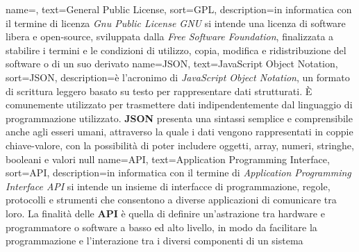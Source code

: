  {
    name=,
    text=General Public License,
    sort=GPL,
    description={in informatica con il termine di licenza \textit{Gnu Public License GNU} si intende  
    una licenza di software libera e open-source, sviluppata dalla \textit{Free Software Foundation}, finalizzata a stabilire i termini e le condizioni 
    di utilizzo, copia, modifica e ridistribuzione del software o di un suo derivato}
}
{
    name={JSON},
    text=JavaScript Object Notation,
    sort=JSON,
    description={è l'acronimo di \textit{JavaScript Object Notation}, un formato di scrittura leggero basato su testo per rappresentare dati strutturati. 
    È comunemente utilizzato per trasmettere dati indipendentemente dal linguaggio di programmazione utilizzato. \textbf{JSON} presenta una sintassi semplice e comprensibile anche agli 
    esseri umani, attraverso la quale i dati vengono rappresentati in coppie chiave-valore, con la possibilità di poter includere 
    oggetti, array, numeri, stringhe, booleani e valori null}
}
{
    name={API},
    text=Application Programming Interface,
    sort=API,
    description={in informatica con il termine di \textit{Application Programming Interface API} si intende un insieme di interfacce di 
    programmazione, regole, protocolli e strumenti che consentono a diverse applicazioni di comunicare tra loro. La finalità delle 
    \textbf{API} è quella di definire un'astrazione tra hardware e programmatore o software a basso ed alto livello, in modo da facilitare
    la programmazione e l'interazione tra i diversi componenti di un sistema}
}
